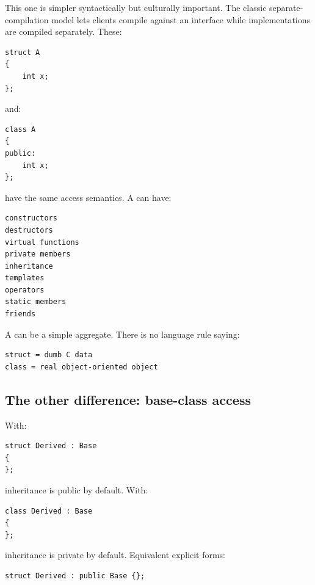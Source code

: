 \hypertarget{05-engine-i-ch003-public-records-and-protected-invariants}{}

This one is simpler syntactically but culturally important. The classic separate-compilation model lets clients compile against an interface while implementations are compiled separately. These:

\begin{verbatim}
struct A
{
    int x;
};
\end{verbatim}

and:

\begin{verbatim}
class A
{
public:
    int x;
};
\end{verbatim}

have the same access semantics. A  can have:

\begin{verbatim}
constructors
destructors
virtual functions
private members
inheritance
templates
operators
static members
friends
\end{verbatim}

A  can be a simple aggregate. There is no language rule saying:

\begin{verbatim}
struct = dumb C data
class = real object-oriented object
\end{verbatim}

\subsection{The other difference: base-class access}\label{05-engine-i-ch003-the-other-difference-base-class-access}

\hypertarget{05-engine-i-ch003-the-other-difference-base-class-access}{}

With:

\begin{verbatim}
struct Derived : Base
{
};
\end{verbatim}

inheritance is public by default. With:

\begin{verbatim}
class Derived : Base
{
};
\end{verbatim}

inheritance is private by default. Equivalent explicit forms:

\begin{verbatim}
struct Derived : public Base {};
\end{verbatim}

